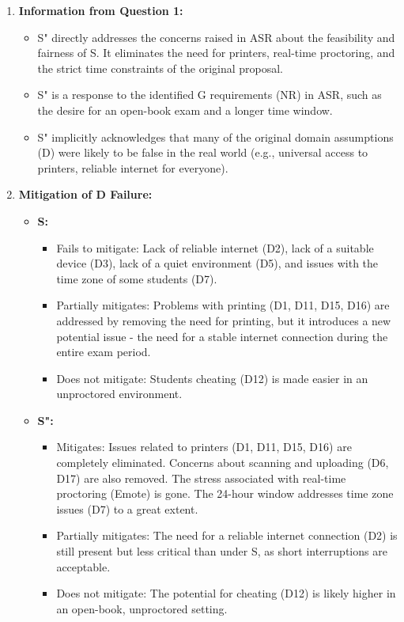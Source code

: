 \documentclass{article}
\begin{document}
\begin{enumerate}
    \item \textbf{Information from Question 1:}
    \begin{itemize}
        \item S" directly addresses the concerns raised in ASR about the feasibility and fairness of S. It eliminates the need for printers, real-time proctoring, and the strict time constraints of the original proposal.
        \item S" is a response to the identified G requirements (NR) in ASR, such as the desire for an open-book exam and a longer time window.
        \item S" implicitly acknowledges that many of the original domain assumptions (D) were likely to be false in the real world (e.g., universal access to printers, reliable internet for everyone).
    \end{itemize}

    \item \textbf{Mitigation of D Failure:}
    \begin{itemize}
        \item \textbf{S:}
        \begin{itemize}
            \item Fails to mitigate: Lack of reliable internet (D2), lack of a suitable device (D3), lack of a quiet environment (D5), and issues with the time zone of some students (D7).
            \item Partially mitigates: Problems with printing (D1, D11, D15, D16) are addressed by removing the need for printing, but it introduces a new potential issue - the need for a stable internet connection during the entire exam period.
            \item Does not mitigate: Students cheating (D12) is made easier in an unproctored environment.
        \end{itemize}
        \item \textbf{S":}
        \begin{itemize}
            \item Mitigates: Issues related to printers (D1, D11, D15, D16) are completely eliminated. Concerns about scanning and uploading (D6, D17) are also removed. The stress associated with real-time proctoring (Emote) is gone. The 24-hour window addresses time zone issues (D7) to a great extent.
            \item Partially mitigates: The need for a reliable internet connection (D2) is still present but less critical than under S, as short interruptions are acceptable.
            \item Does not mitigate: The potential for cheating (D12) is likely higher in an open-book, unproctored setting.
        \end{itemize}
    \end{itemize}


\end{enumerate}
\end{document}
